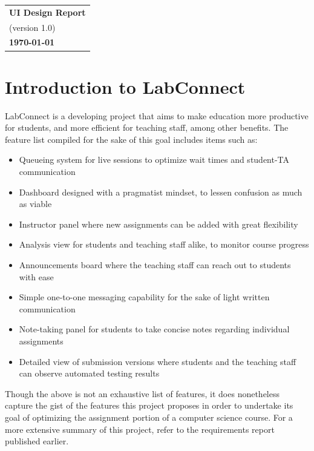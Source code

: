\documentclass[a4paper, 12pt]{article}
\begin{document}
    \begin{table}[h!]
        \renewcommand{\arraystretch}{1.5}
        \centering
        \begin{tabular}{ |>{\centering\arraybackslash}m{15.15cm}| }
            \hline
            \Large \textbf{UI Design Report} \\
            \small (version 1.0) \\
            \small \textbf{\today} \\
            \hline
        \end{tabular}
    \end{table}


    \section{Introduction to LabConnect}

    LabConnect is a developing project that aims to make education more productive for students,
    and more efficient for teaching staff, among other benefits. The feature list compiled for the
    sake of this goal includes items such as:
    \begin{itemize}
        \item Queueing system for live sessions to optimize wait times and student-TA communication
        \item Dashboard designed with a pragmatist mindset, to lessen confusion as much as viable
        \item Instructor panel where new assignments can be added with great flexibility
        \item Analysis view for students and teaching staff alike, to monitor course progress
        \item Announcements board where the teaching staff can reach out to students with ease
        \item Simple one-to-one messaging capability for the sake of light written communication
        \item Note-taking panel for students to take concise notes regarding individual assignments
        \item Detailed view of submission versions where students and the teaching staff can observe
            automated testing results
    \end{itemize}

    Though the above is not an exhaustive list of features, it does nonetheless capture the gist of the features
    this project proposes in order to undertake its goal of optimizing the assignment portion of
    a computer science course. For a more extensive summary of this project, refer to the requirements report published earlier.
\end{document}
